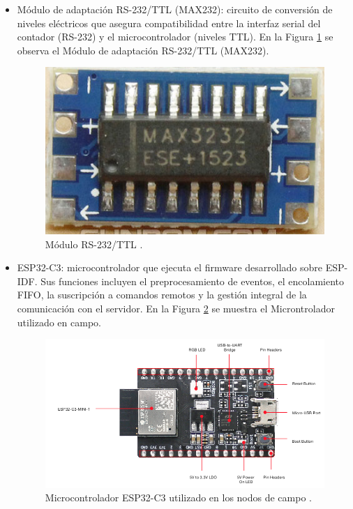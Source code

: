 \begin{itemize}
 
    \item Módulo de adaptación RS-232/TTL (MAX232): circuito de conversión de niveles eléctricos que asegura compatibilidad entre la interfaz serial del contador (RS-232) y el microcontrolador (niveles TTL).
  En la Figura \ref{fig:foto_max232} se observa el Módulo de adaptación RS-232/TTL (MAX232).


  \begin{figure}[htbp]
  \centering
  \includegraphics[width=0.4\linewidth]{./Figures/fotoMax232.png}
  \caption{Módulo RS-232/TTL \protect\footnotemark.}
  \label{fig:foto_max232}
\end{figure}

     
    
    \item ESP32-C3: microcontrolador que ejecuta el firmware desarrollado sobre ESP-IDF. Sus funciones incluyen el preprocesamiento de eventos, el encolamiento FIFO, la suscripción a comandos remotos y la gestión integral de la comunicación con el servidor.
   En la Figura \ref{fig:esp32} se muestra el Microntrolador utilizado en campo.

\begin{figure}[htbp]
  \centering
  \includegraphics[width=0.85\linewidth]{./Figures/fotoEsp32c3.png}
  \caption{Microcontrolador ESP32-C3 utilizado en los nodos de campo \protect\footnotemark.}
  \label{fig:esp32}
\end{figure}


\end{itemize}
